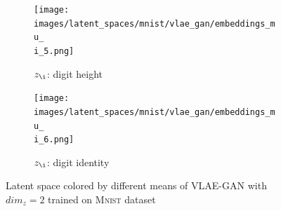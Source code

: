 \documentclass[11pt,a4paper]{article}
\begin{document}
\begin{landscape}
\begin{figure}[H]
{\begin{adjustbox}{valign=T}
\begin{subfigure}{.19\textwidth}
\texttt{[image: images/latent\_spaces/mnist/vlae\_gan/embeddings\_mu\_\\i\_5.png]}
\caption{$z_{\i}$: digit height}
\label{subfig:vlae_mnist_latent_space_z_\i_height}
\end{subfigure}
\end{adjustbox}
\hfill
\begin{adjustbox}{valign=T}
\begin{subfigure}{.19\textwidth}
\texttt{[image: images/latent\_spaces/mnist/vlae\_gan/embeddings\_mu\_\\i\_6.png]}
\caption{$z_{\i}$: digit identity}
\label{subfig:vlae_mnist_latent_space_z_\i_identity}
\end{subfigure}
\end{adjustbox}}
\caption[\ac{VLAE}-\ac{GAN} Latent Space - \textsc{Mnist}]{Latent space colored by different means of \ac{VLAE}-\ac{GAN} with $dim_z=2$ trained on \textsc{Mnist} dataset}
\label{fig:vlae_latent_space_mnist}
\end{figure}
\end{landscape}
\end{document}
